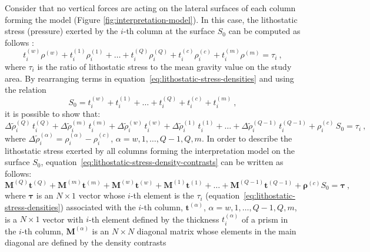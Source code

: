 \documentclass[manuscript]{geophysics}
\begin{document}
Consider that no vertical forces are acting on the lateral surfaces of 
each column forming the model (Figure \ref{fig:interpretation-model}). In this case, 
the lithostatic stress (pressure) exerted by the $i$-th column at the surface $S_{0}$
can be computed as follows \citep{turcotte-schubert2002}:
\begin{equation}
t^{(w)}_{i} \rho^{(w)} + t^{(1)}_{i} \rho^{(1)}_{i} + \dots + 
t^{(Q)}_{i} \rho^{(Q)}_{i} + t^{(c)}_{i} \rho^{(c)}_{i} + t^{(m)}_{i} \rho^{(m)} 
= \tau_{i} \: ,
\label{eq:lithostatic-stress-densities}
\end{equation}
where $\tau_{i}$ is the ratio of lithostatic stress to the mean gravity 
value on the study area.
By rearranging terms in equation~\ref{eq:lithostatic-stress-densities} 
and using the relation
\begin{equation}
S_{0} = t^{(w)}_{i} + t^{(1)}_{i} + \dots + t^{(Q)}_{i} + t^{(c)}_{i} + t^{(m)}_{i} \: ,
\label{eq:S0}
\end{equation}
it is possible to show that:
\begin{equation}
\Delta \tilde{\rho}^{(Q)}_{i} \, t^{(Q)}_{i} + 
\Delta \tilde{\rho}^{(m)}_{i} \, t^{(m)}_{i} + 
\Delta \tilde{\rho}^{(w)}_{i} \, t^{(w)}_{i} + 
\Delta \tilde{\rho}^{(1)}_{i} \, t^{(1)}_{i} +
\dots + 
\Delta \tilde{\rho}^{(Q-1)}_{i} \, t^{(Q-1)}_{i} +
\rho^{(c)}_{i} \, S_{0} = \tau_{i} \: ,
\label{eq:lithostatic-stress-density-contrasts}
\end{equation}
where $\Delta \tilde{\rho}^{(\alpha)}_{i} = \rho^{(\alpha)}_{i} - \rho^{(c)}_{i}$, 
$\alpha = w, 1, \dots, Q-1, Q, m$.
In order to describe the lithostatic stress exerted by all columns forming the
interpretation model on the surface $S_{0}$, 
equation~\ref{eq:lithostatic-stress-density-contrasts} 
can be written as follows:
\begin{equation}
\mathbf{M}^{(Q)} \mathbf{t}^{(Q)} + \mathbf{M}^{(m)} \mathbf{t}^{(m)} + \mathbf{M}^{(w)}
\mathbf{t}^{(w)} + \mathbf{M}^{(1)} \mathbf{t}^{(1)} + \dots + \mathbf{M}^{(Q-1)}
\mathbf{t}^{(Q-1)} + \boldsymbol{\rho}^{(c)} S_{0} = \boldsymbol{\tau} \: ,
\label{eq:lithostatic-stress-matrix}
\end{equation}
where $\boldsymbol{\tau}$ is an $N \times 1$ vector whose $i$-th element is
the $\tau_{i}$ (equation~\ref{eq:lithostatic-stress-densities}) associated with
the $i$-th column, $\mathbf{t}^{(\alpha)}$, $\alpha = w, 1, \dots, Q-1, Q, m$, 
is a $N \times 1$ vector with $i$-th element defined by the thickness 
$t^{(\alpha)}_{i}$ of a prism in the $i$-th column, $\mathbf{M}^{(\alpha)}$ is an $N \times N$ diagonal matrix whose elements in the main diagonal are defined by the density contrasts 
\end{document}

